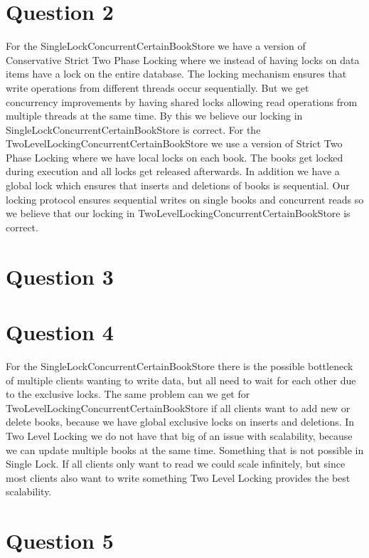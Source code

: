 \documentclass[12pt,a4paper]{article}
\begin{document}
\section{Question 2}
For the SingleLockConcurrentCertainBookStore we have a version of Conservative Strict Two Phase Locking where we instead of having locks on data items have a lock on the entire database. The locking mechanism ensures that write operations from different threads occur sequentially. But we get concurrency improvements by having shared locks allowing read operations from multiple threads at the same time. By this we believe our locking in SingleLockConcurrentCertainBookStore is correct.
For the TwoLevelLockingConcurrentCertainBookStore we use a version of Strict Two Phase Locking where we have local locks on each book. The books get locked during execution and all locks get released afterwards. In addition we have a global lock which ensures that inserts and deletions of books is sequential. Our locking protocol ensures sequential writes on single books and concurrent reads so we believe that our locking in TwoLevelLockingConcurrentCertainBookStore is correct.

\section{Question 3}

\section{Question 4}
For the SingleLockConcurrentCertainBookStore there is the possible bottleneck of multiple clients wanting to write data, but all need to wait for each other due to the exclusive locks. The same problem can we get for TwoLevelLockingConcurrentCertainBookStore if all clients want to add new or delete books, because we have global exclusive locks on inserts and deletions. In Two Level Locking we do not have that big of an issue with scalability, because we can update multiple books at the same time. Something that is not possible in Single Lock.
If all clients only want to read we could scale infinitely, but since most clients also want to write something Two Level Locking provides the best scalability. 

\section{Question 5}
\end{document}
